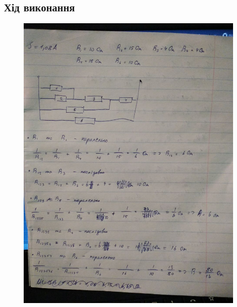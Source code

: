 \documentclass{article}
\begin{document}
\begin{normalsize}
	\section*{Хід виконання}
	\begin{figure}[H]
		\centering
		\includegraphics[scale=0.4]{11}
	\end{figure}
	

\end{normalsize}
\end{document}
